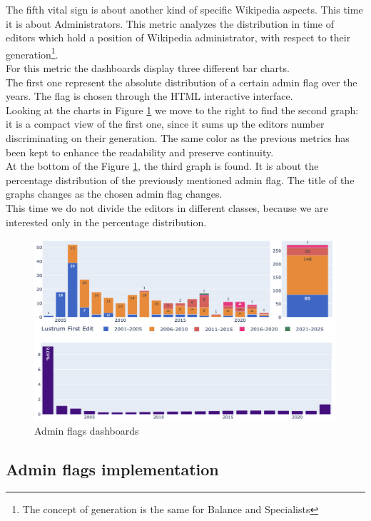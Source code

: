 The fifth vital sign is about another kind of specific Wikipedia aspects. This time it is about Administrators. This metric analyzes the distribution in time of editors which hold a position of Wikipedia administrator, with respect to their generation\footnote{The concept of generation is the same for Balance and Specialists}.\\
For this metric the dashboards display three different bar charts.\\
The first one represent the absolute distribution of a certain admin flag over the years. The flag is chosen through the HTML interactive interface.\\
Looking at the charts in Figure \ref{fig:admin} we move to the right to find the second graph: it is a compact view of the first one, since it sums up the editors number discriminating on their generation. The same color as the previous metrics has been kept to enhance the readability and preserve continuity.\\
At the bottom of the Figure \ref{fig:admin}, the third graph is found. It is about the percentage distribution of the previously mentioned admin flag. The title of the graphs changes as the chosen admin flag changes.\\
This time we do not divide the editors in different classes, because we are interested only in the percentage distribution.\\

\begin{figure}[h]
    \centering
    \includegraphics[width=470px]{img/admin.png}
    \caption{Admin flags dashboards}
    \label{fig:admin}
\end{figure}

\subsection{Admin flags implementation}
\label{sec:admin_flags_callback}

